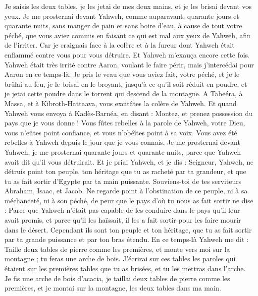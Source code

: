 \begin{multicols}{2}
Je saisis les deux tables, je les jetai de mes deux mains, et je les brisai devant vos yeux.
Je me prosternai devant Yahweh, comme auparavant, quarante jours et quarante nuits, sans manger de pain et sans boire d'eau, à cause de tout votre péché, que vous aviez commis en faisant ce qui est mal aux yeux de Yahweh, afin de l'irriter.
Car je craignais face à la colère et à la fureur dont Yahweh était enflammé contre vous pour vous détruire. Et Yahweh m'exauça encore cette fois.
Yahweh était très irrité contre Aaron, voulant le faire périr, mais j’intercédai pour Aaron en ce temps-là.
Je pris le veau que vous aviez fait, votre péché, et je le brûlai au feu, je le brisai en le broyant, jusqu'à ce qu'il soit réduit en poudre, et je jetai cette poudre dans le torrent qui descend de la montagne.
A Tabeéra, à Massa, et à Kibroth-Hattaava, vous excitâtes la colère de Yahweh.
Et quand Yahweh vous envoya à Kadès-Barnéa, en disant : Montez, et prenez possession du pays que je vous donne ! Vous fûtes rebelles à la parole de Yahweh, votre Dieu, vous n’eûtes point confiance, et vous n'obéîtes point à sa voix.
Vous avez été rebelles à Yahweh depuis le jour que je vous connais.
Je me prosternai devant Yahweh, je me prosternai quarante jours et quarante nuits, parce que Yahweh avait dit qu'il vous détruirait.
Et je priai Yahweh, et je dis : Seigneur, Yahweh, ne détruis point ton peuple, ton héritage que tu as racheté par ta grandeur, et que tu as fait sortir d'Egypte par ta main puissante.
Souviens-toi de tes serviteurs Abraham, Isaac, et Jacob. Ne regarde point à l’obstination de ce peuple, ni à sa méchanceté, ni à son péché,
de peur que le pays d’où tu nous as fait sortir ne dise : Parce que Yahweh n’était pas capable de les conduire dans le pays qu’il leur avait promis, et parce qu’il les haïssait, il les a fait sortir pour les faire mourir dans le désert.
Cependant ils sont ton peuple et ton héritage, que tu as fait sortir par ta grande puissance et par ton bras étendu.
\VerseOne{}En ce temps-là Yahweh me dit : Taille deux tables de pierre comme les premières, et monte vers moi sur la montagne ; tu feras une arche de bois.
J'écrirai sur ces tables les paroles qui étaient sur les premières tables que tu as brisées, et tu les mettras dans l'arche.
Je fis une arche de bois d’acacia, je taillai deux tables de pierre comme les premières, et je montai sur la montagne, les deux tables dans ma main.

\end{multicols}
